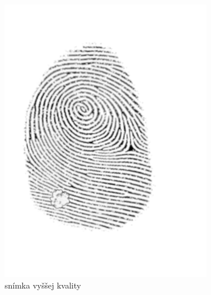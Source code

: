   \begin{figure}[h]
    \centering
    \begin{subfigure}[b]{0.3\linewidth}
      \includegraphics[width=\linewidth]{obrazky-figures/warts_orig.png}
      \caption{snímka vyššej kvality}
    \end{subfigure}
    \hfill
    \begin{subfigure}[b]{0.3\linewidth}

\end{subfigure}
\end{figure}
